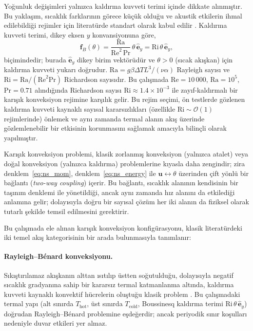 Yoğunluk değişimleri yalnızca kaldırma kuvveti terimi içinde dikkate alınmıştır. Bu yaklaşım, sıcaklık farklarının görece küçük olduğu ve akustik etkilerin ihmal edilebildiği rejimler için literatürde standart olarak kabul edilir \cite{tritton_physical_1988, bejan_convection_2013}. Kaldırma kuvveti terimi, dikey eksen $y$ konvansiyonuna göre,
\begin{equation}
\mathbf{f}_{B}(\theta) = \frac{\mathrm{Ra}}{\mathrm{Re}^{2}\,\mathrm{Pr}}\,\theta\,\hat{\mathbf{e}}_{y}
= \mathrm{Ri}\,\theta\,\hat{\mathbf{e}}_{y},
\label{eq:buoyancy}
\end{equation}
biçimindedir; burada $\hat{\mathbf{e}}_{y}$ dikey birim vektörüdür ve $\theta>0$ (sıcak akışkan) için kaldırma kuvveti yukarı doğrudur. $\mathrm{Ra}=g\beta\Delta T L^{3}/(\nu\alpha)$ Rayleigh sayısı ve $\mathrm{Ri}=\mathrm{Ra}/(\mathrm{Re}^{2}\mathrm{Pr})$ Richardson sayısıdır. Bu çalışmada $\mathrm{Re}=10\,000$, $\mathrm{Ra}=10^{5}$, $\mathrm{Pr}=0.71$ alındığında Richardson sayısı $\mathrm{Ri}\approx 1.4\times 10^{-3}$ ile zayıf-kaldırmalı bir karışık konveksiyon rejimine karşılık gelir. Bu rejim seçimi, ön testlerde gözlenen kaldırma kuvveti kaynaklı sayısal kararsızlıkları (özellikle $\mathrm{Ri}\sim\mathcal{O}(1)$ rejimlerinde) önlemek ve aynı zamanda termal alanın akış üzerinde gözlemlenebilir bir etkisinin korunmasını sağlamak amacıyla bilinçli olarak yapılmıştır.

Karışık konveksiyon problemi, klasik zorlanmış konveksiyon (yalnızca atalet) veya doğal konveksiyon (yalnızca kaldırma) problemlerine kıyasla daha zengindir; zira denklem~\eqref{eq:ns_mom}, denklem~\eqref{eq:ns_energy} ile $\mathbf{u}\leftrightarrow\theta$ üzerinden çift yönlü bir bağlantı (\textit{two-way coupling}) içerir. Bu bağlantı, sıcaklık alanının kendisinin bir taşınım denklemi ile yönetildiği, ancak aynı zamanda hız alanını da etkilediği anlamına gelir; dolayısıyla doğru bir sayısal çözüm her iki alanın da fiziksel olarak tutarlı şekilde temsil edilmesini gerektirir.

Bu çalışmada ele alınan karışık konveksiyon konfigürasyonu, klasik literatürdeki iki temel akış kategorisinin bir arada bulunmasıyla tanımlanır:

\paragraph{Rayleigh--B\'enard konveksiyonu.} Sıkıştırılamaz akışkanın alttan ısıtılıp üstten soğutulduğu, dolayısıyla negatif sıcaklık gradyanına sahip bir kararsız termal katmanlanma altında, kaldırma kuvveti kaynaklı konvektif hücrelerin oluştuğu klasik problem \cite{tritton_physical_1988, bejan_convection_2013}. Bu çalışmadaki termal yapı (alt sınırda $T_{\mathrm{hot}}$, üst sınırda $T_{\mathrm{cold}}$, Boussinesq kaldırma terimi $\mathrm{Ri}\,\theta\,\hat{\mathbf{e}}_{y}$) doğrudan Rayleigh--B\'enard problemine eşdeğerdir; ancak periyodik sınır koşulları nedeniyle duvar etkileri yer almaz.

